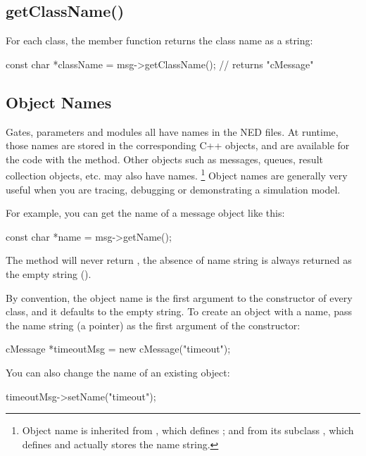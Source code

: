 \subsection{getClassName()}
\label{sec:sim-lib:classname}


For each class, the  member function returns the class
name as a string:

\begin{cpp}
const char *className = msg->getClassName(); // returns "cMessage"
\end{cpp}


\subsection{Object Names}
\label{sec:sim-lib:name}

Gates, parameters and modules all have names in the NED files. At runtime,
those names are stored in the corresponding C++ objects, and are available
for the code with the  method. Other objects such as messages,
queues, result collection objects, etc. may also have names.
  \footnote{Object name is inherited from , which defines
  ; and from its subclass , which
  defines  and actually stores the name string.}
Object names are generally very useful when you are tracing, debugging or
demonstrating a simulation model.

For example, you can get the name of a message object like this:

\begin{cpp}
const char *name = msg->getName();
\end{cpp}

The  method will never return , the absence
of name string is always returned as the empty string ().

By convention, the object name is the first argument to the constructor
of every class, and it defaults to the empty string. To create an object with
a name, pass the name string (a  pointer) as the first
argument of the constructor:

\begin{cpp}
cMessage *timeoutMsg = new cMessage("timeout");
\end{cpp}

You can also change the name of an existing object:

\begin{cpp}
timeoutMsg->setName("timeout");
\end{cpp}

